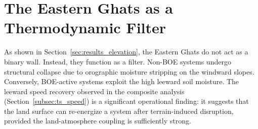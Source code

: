 \section{The Eastern Ghats as a Thermodynamic Filter}
\label{sec:disc_ghats}

As shown in Section~\ref{sec:results_elevation}, the Eastern Ghats do not
act as a binary wall. Instead, they function as a filter. Non-BOE
systems undergo structural collapse due to orographic moisture
stripping on the windward slopes. Conversely, BOE-active systems
exploit the high leeward soil moisture. The leeward speed recovery
observed in the composite analysis (Section~\ref{subsec:ts_speed}) is
a significant operational finding: it suggests that the land surface
can re-energize a system after terrain-induced disruption, provided
the land-atmosphere coupling is sufficiently strong.

